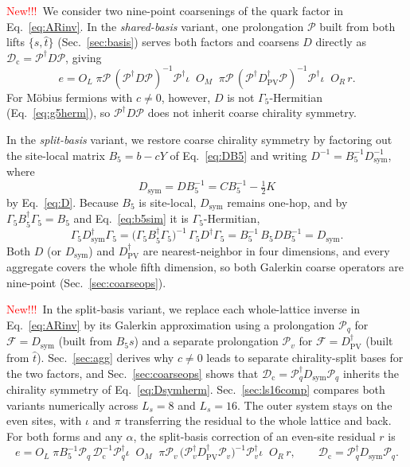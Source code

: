 \documentclass[11pt,a4paper]{article}
\newif\ifshownew \shownewtrue
\DeclareRobustCommand\New{\ifshownew\textcolor{red}{New!!!}\ \else\ignorespaces\fi}
\numberwithin{equation}{section}
\newcommand{\dg}{^{\dagger}}
\newcommand{\Dpv}{D_{\mathrm{PV}}}
\newcommand{\Gfive}{\Gamma_5}
\newcommand{\Pro}{\mathcal P}
\newcommand{\Pq}{\Pro_q}
\newcommand{\Pv}{\Pro_v}
\newcommand{\Dc}{\mathcal D_{\mathrm c}}
\newcommand{\Dsym}{D_{\mathrm{sym}}}
\begin{document}
\New We consider two nine-point coarsenings of the quark factor in Eq.~\eqref{eq:ARinv}. In the
\emph{shared-basis} variant, one prolongation $\Pro$ built from both lifts $\{s,\hat t\}$
(Sec.~\ref{sec:basis}) serves both factors and coarsens $D$ directly as $\Dc=\Pro\dg D\Pro$, giving
\begin{equation}
e=O_L\;\pi\Pro\,(\Pro\dg D\Pro)^{-1}\Pro\dg\iota\;\;O_M\;\;
  \pi\Pro\,(\Pro\dg\Dpv\dg\Pro)^{-1}\Pro\dg\iota\;\;O_R\,r .
\label{eq:corrplain}
\end{equation}
For M\"obius fermions with $c\neq0$, however, $D$ is not $\Gfive$-Hermitian (Eq.~\eqref{eq:g5herm}),
so $\Pro\dg D\Pro$ does not inherit coarse chirality symmetry.

In the \emph{split-basis} variant, we restore coarse chirality symmetry by factoring out the
site-local matrix $B_5=b-cY$ of Eq.~\eqref{eq:DB5} and writing $D^{-1}=B_5^{-1}\Dsym^{-1}$, where
\begin{equation}
\Dsym=DB_5^{-1}=CB_5^{-1}-\tfrac12K
\label{eq:Dsym}
\end{equation}
by Eq.~\eqref{eq:D}. Because $B_5$ is site-local, $\Dsym$ remains one-hop, and by
$\Gfive B_5\dg\Gfive=B_5$ and Eq.~\eqref{eq:b5sim} it is $\Gfive$-Hermitian,
\begin{equation}
\Gfive\Dsym\dg\Gfive=\big(\Gfive B_5\dg\Gfive\big)^{-1}\,\Gfive D\dg\Gfive
=B_5^{-1}\,B_5DB_5^{-1}=\Dsym .
\label{eq:Dsymherm}
\end{equation}
Both $D$ (or $\Dsym$) and $\Dpv\dg$ are nearest-neighbor in four dimensions, and every aggregate
covers the whole fifth dimension, so both Galerkin coarse operators are nine-point
(Sec.~\ref{sec:coarseops}).

\New In the split-basis variant, we replace each whole-lattice inverse in Eq.~\eqref{eq:ARinv} by
its Galerkin approximation using a prolongation $\Pq$ for $\mathcal F=\Dsym$ (built from $B_5s$)
and a separate prolongation $\Pv$ for $\mathcal F=\Dpv\dg$ (built from $\hat t$).
Sec.~\ref{sec:agg} derives why $c\neq0$ leads to separate chirality-split bases for the two
factors, and Sec.~\ref{sec:coarseops} shows that $\Dc=\Pq\dg\Dsym\Pq$ inherits the chirality
symmetry of Eq.~\eqref{eq:Dsymherm}. Sec.~\ref{sec:ls16comp} compares both variants numerically
across $L_s=8$ and $L_s=16$. The outer system stays on the even sites, with $\iota$ and $\pi$
transferring the residual to the whole lattice and back. For both forms and any $\alpha$, the
split-basis correction of an even-site residual $r$ is
\begin{equation}
e=O_L\;\pi B_5^{-1}\Pq\,\Dc^{-1}\Pq\dg\iota\;\;O_M\;\;
  \pi\Pv\,\big(\Pv\dg\Dpv\dg\Pv\big)^{-1}\Pv\dg\iota\;\;O_R\,r,
\qquad \Dc=\Pq\dg\Dsym\Pq .
\label{eq:corr}
\end{equation}
\end{document}
